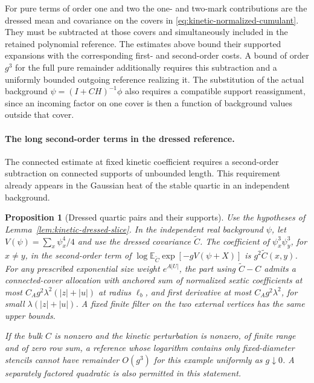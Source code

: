 \documentclass[11pt]{article}
\newtheorem{proposition}[theorem]{Proposition}
\theoremstyle{definition}
\newcommand{\E}{\mathbb E}
\begin{document}
For pure terms of order one and two the one- and two-mark
contributions are the dressed mean and covariance on the
covers in \eqref{eq:kinetic-normalized-cumulant}. They must
be subtracted at those covers and simultaneously included
in the retained polynomial reference. The estimates above
bound their supported expansions with the corresponding
first- and second-order costs. A bound of order \(g^3\) for the
full pure remainder additionally requires this subtraction
and a uniformly bounded outgoing reference realizing it.
The substitution of the actual background
\(\psi=(I+CH)^{-1}\phi\) also requires a compatible support
reassignment, since an incoming factor on one cover is
then a function of background values outside that cover.

\paragraph{The long second-order terms in the dressed reference.}
The connected estimate at fixed kinetic coefficient requires a
second-order subtraction on connected supports of unbounded
length. This requirement already appears in the Gaussian heat of
the stable quartic in an independent background.

\begin{proposition}[Dressed quartic pairs and their supports]
\label{prop:kinetic-quartic-pairs}
Use the hypotheses of Lemma~\ref{lem:kinetic-dressed-slice}.
In the independent real background \(\psi\), let
\(V(\psi)=\sum_x\psi_x^4/4\) and use the dressed covariance
\(\widetilde C\). The coefficient of \(\psi_x^3\psi_y^3\),
for \(x\ne y\), in the second-order term of
\(\log\E_{\widetilde C}\exp[-gV(\psi+X)]\) is
\(g^2\widetilde C(x,y)\).
For any prescribed exponential size weight \(e^{A|U|}\),
the part using \(\widetilde C-C\) admits a connected-cover
allocation with anchored sum of normalized sextic coefficients
at most \(C_A g^2\lambda^2(|z|+|u|)\) at radius \(\ell_b\),
and first derivative at most \(C_Ag^2\lambda^2\), for
small \(\lambda(|z|+|u|)\). A fixed finite filter on the two
external vertices has the same upper bounds.

If the bulk \(C\) is nonzero and the kinetic perturbation
is nonzero, of finite range and of zero row sum, a reference
whose logarithm contains only fixed-diameter stencils cannot
have remainder \(O(g^3)\) for this example uniformly as
\(g\downarrow0\). A separately factored quadratic is also
permitted in this statement.
\end{proposition}
\end{document}
